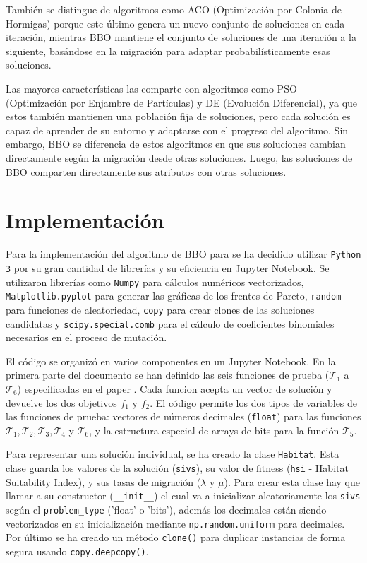\documentclass{article}
\begin{document}
También se distingue de algoritmos como ACO (Optimización por Colonia de Hormigas) porque este último genera un nuevo conjunto de soluciones en cada iteración, mientras BBO mantiene el conjunto de soluciones de una iteración a la siguiente, basándose en la migración para adaptar probabilísticamente esas soluciones.

Las mayores características las comparte con algoritmos como PSO (Optimización por Enjambre de Partículas) y DE (Evolución Diferencial), ya que estos también mantienen una población fija de soluciones, pero cada solución es capaz de aprender de su entorno y adaptarse con el progreso del algoritmo.
Sin embargo, BBO se diferencia de estos algoritmos en que sus soluciones cambian directamente según la migración desde otras soluciones. Luego, las soluciones de BBO comparten directamente sus atributos con otras soluciones.

\section{Implementación}
\label{sec:meta2_implementacion}
Para la implementación del algoritmo de BBO para se ha decidido utilizar \verb|Python 3| por su gran cantidad de librerías y su eficiencia en Jupyter Notebook. Se utilizaron librerías como \verb|Numpy| para cálculos numéricos vectorizados, \verb|Matplotlib.pyplot| para generar las gráficas de los frentes de Pareto, \verb|random| para funciones de aleatoriedad, \verb|copy| para crear clones de las soluciones candidatas y \verb|scipy.special.comb| para el cálculo de coeficientes binomiales necesarios en el proceso de mutación.

El código se organizó en varios componentes en un Jupyter Notebook. En la primera parte del documento se han definido las seis funciones de prueba ($\mathcal{T}_1$ a $\mathcal{T}_6$) especificadas en el paper . Cada funcion acepta un vector de solución y devuelve los dos objetivos $f_1$ y $f_2$. El código permite los dos tipos de variables de las funciones de prueba: vectores de números decimales (\verb|float|) para las funciones $\mathcal{T}_1, \mathcal{T}_2, \mathcal{T}_3, \mathcal{T}_4$ y $\mathcal{T}_6$, y la estructura especial de arrays de bits para la función $\mathcal{T}_5$.

Para representar una solución individual, se ha creado la clase \verb|Habitat|. Esta clase guarda los valores de la solución (\verb|sivs|), su valor de fitness (\verb|hsi| - Habitat Suitability Index), y sus tasas de migración ($\lambda$ y $\mu$). Para crear esta clase hay que llamar a su constructor (\verb|__init__|) el cual va a inicializar aleatoriamente los \verb|sivs| según el \verb|problem_type| ('float' o 'bits'), además los decimales están siendo vectorizados en su inicialización mediante \verb|np.random.uniform| para decimales. Por último se ha creado un método \verb|clone()| para duplicar instancias de forma segura usando \verb|copy.deepcopy()|.
\end{document}
